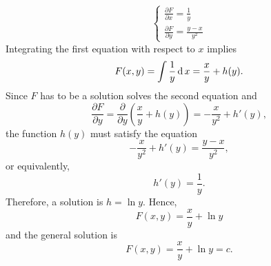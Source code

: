 \begin{solution}
\begin{enumerate}
\[\begin{cases}
		\frac{\partial F}{\partial x} = \frac{1}{y}\\
		\frac{\partial F}{\partial y} = \frac{y-x}{y^2}
		\end{cases}
		\]
		Integrating the first equation with respect to $x$ implies
		\[  
		F(x, y) = \int \frac{1}{y} \operatorname{d} x  =\frac{x}{y} + h(y).
		\]
		Since $F$ has to be a solution solves the second equation and
		\[
		\frac{\partial F}{\partial y} = \frac{\partial }{\partial y}\left(\frac{x}{y} + h(y)\right) = -\frac{x}{y^2} + h'(y),
		\]
		the function $h(y)$ must satisfy the equation
		\[-\frac{x}{y^2} + h'(y) =\frac{y-x}{y^2},\]
		or equivalently,
		\[h'(y) =\frac1y.\]
		Therefore, a solution is $h=\ln y$. Hence, 
		\[F(x, y)=\frac{x}{y}+\ln y\]
		and the general solution is 
		\[F(x, y)=  \frac{x}{y} + \ln y=c.\]
	\end{enumerate}
\end{solution}

